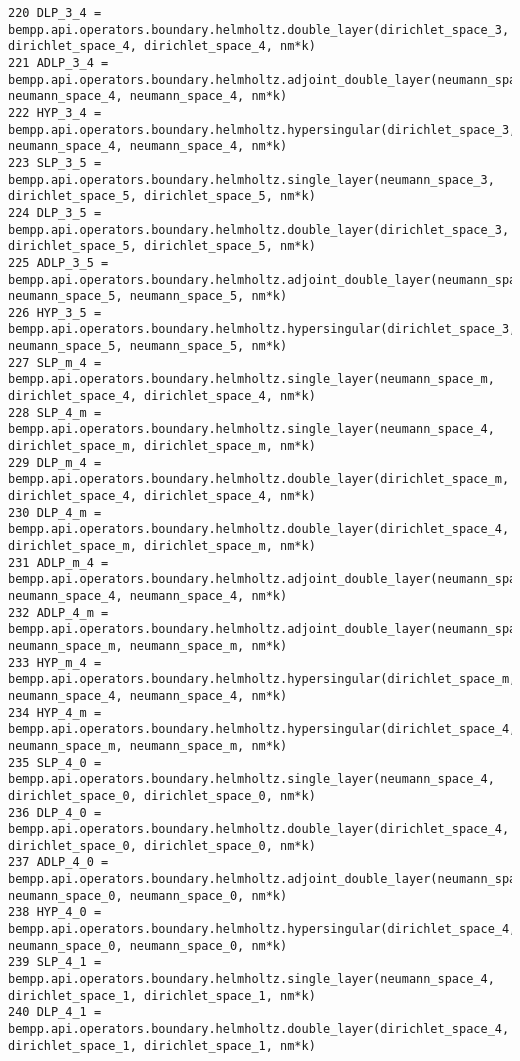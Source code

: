 \documentclass[12pt,letterpaper]{report}
\numberwithin{equation}{section}
\begin{document}
\begin{lstlisting}
220 DLP_3_4 = bempp.api.operators.boundary.helmholtz.double_layer(dirichlet_space_3, dirichlet_space_4, dirichlet_space_4, nm*k)
221 ADLP_3_4 = bempp.api.operators.boundary.helmholtz.adjoint_double_layer(neumann_space_3, neumann_space_4, neumann_space_4, nm*k)
222 HYP_3_4 = bempp.api.operators.boundary.helmholtz.hypersingular(dirichlet_space_3, neumann_space_4, neumann_space_4, nm*k)
223 SLP_3_5 = bempp.api.operators.boundary.helmholtz.single_layer(neumann_space_3, dirichlet_space_5, dirichlet_space_5, nm*k)
224 DLP_3_5 = bempp.api.operators.boundary.helmholtz.double_layer(dirichlet_space_3, dirichlet_space_5, dirichlet_space_5, nm*k)
225 ADLP_3_5 = bempp.api.operators.boundary.helmholtz.adjoint_double_layer(neumann_space_3, neumann_space_5, neumann_space_5, nm*k)
226 HYP_3_5 = bempp.api.operators.boundary.helmholtz.hypersingular(dirichlet_space_3, neumann_space_5, neumann_space_5, nm*k)
227 SLP_m_4 = bempp.api.operators.boundary.helmholtz.single_layer(neumann_space_m, dirichlet_space_4, dirichlet_space_4, nm*k)
228 SLP_4_m = bempp.api.operators.boundary.helmholtz.single_layer(neumann_space_4, dirichlet_space_m, dirichlet_space_m, nm*k)
229 DLP_m_4 = bempp.api.operators.boundary.helmholtz.double_layer(dirichlet_space_m, dirichlet_space_4, dirichlet_space_4, nm*k)
230 DLP_4_m = bempp.api.operators.boundary.helmholtz.double_layer(dirichlet_space_4, dirichlet_space_m, dirichlet_space_m, nm*k)
231 ADLP_m_4 = bempp.api.operators.boundary.helmholtz.adjoint_double_layer(neumann_space_m, neumann_space_4, neumann_space_4, nm*k)
232 ADLP_4_m = bempp.api.operators.boundary.helmholtz.adjoint_double_layer(neumann_space_4, neumann_space_m, neumann_space_m, nm*k)
233 HYP_m_4 = bempp.api.operators.boundary.helmholtz.hypersingular(dirichlet_space_m, neumann_space_4, neumann_space_4, nm*k)
234 HYP_4_m = bempp.api.operators.boundary.helmholtz.hypersingular(dirichlet_space_4, neumann_space_m, neumann_space_m, nm*k)
235 SLP_4_0 = bempp.api.operators.boundary.helmholtz.single_layer(neumann_space_4, dirichlet_space_0, dirichlet_space_0, nm*k)
236 DLP_4_0 = bempp.api.operators.boundary.helmholtz.double_layer(dirichlet_space_4, dirichlet_space_0, dirichlet_space_0, nm*k)
237 ADLP_4_0 = bempp.api.operators.boundary.helmholtz.adjoint_double_layer(neumann_space_4, neumann_space_0, neumann_space_0, nm*k)
238 HYP_4_0 = bempp.api.operators.boundary.helmholtz.hypersingular(dirichlet_space_4, neumann_space_0, neumann_space_0, nm*k)
239 SLP_4_1 = bempp.api.operators.boundary.helmholtz.single_layer(neumann_space_4, dirichlet_space_1, dirichlet_space_1, nm*k)
240 DLP_4_1 = bempp.api.operators.boundary.helmholtz.double_layer(dirichlet_space_4, dirichlet_space_1, dirichlet_space_1, nm*k)

\end{lstlisting}
\end{document}
